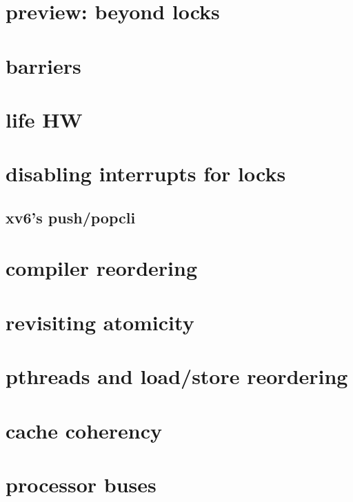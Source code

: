 \section{preview: beyond locks}


\section{barriers}


\section{life HW}


\section{disabling interrupts for locks}


\subsection{xv6's push/popcli}


\section{compiler reordering}


\section{revisiting atomicity}


\section{pthreads and load/store reordering}




\section{cache coherency}
\section{processor buses}


